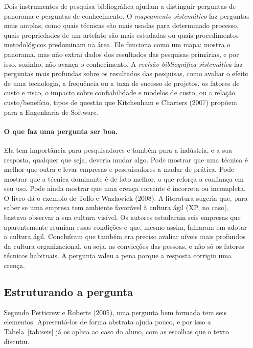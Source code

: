 \documentclass[10pt,a4paper]{extarticle}
\theoremstyle{definition}
\begin{document}
Dois instrumentos de pesquisa bibliográfica ajudam a distinguir perguntas de panorama e perguntas de conhecimento. O \emph{mapeamento sistemático} faz perguntas mais amplas, como quais técnicas são mais usadas para determinado processo, quais propriedades de um artefato são mais estudadas ou quais procedimentos metodológicos predominam na área. Ele funciona como um mapa: mostra o panorama, mas não extrai dados dos resultados das pesquisas primárias, e por isso, sozinho, não avança o conhecimento. A \emph{revisão bibliográfica sistemática} faz perguntas mais profundas sobre os resultados das pesquisas, como avaliar o efeito de uma tecnologia, a frequência ou a taxa de sucesso de projetos, os fatores de custo e risco, o impacto sobre confiabilidade e modelos de custo, ou a relação custo/benefício, tipos de questão que Kitchenham e Charters (2007) propõem para a Engenharia de Software.

\paragraph{O que faz uma pergunta ser boa.} Ela tem importância para pesquisadores e também para a indústria, e a sua resposta, qualquer que seja, deveria mudar algo. Pode mostrar que uma técnica é melhor que outra e levar empresas e pesquisadores a mudar de prática. Pode mostrar que a técnica dominante é de fato melhor, o que reforça a confiança em seu uso. Pode ainda mostrar que uma crença corrente é incorreta ou incompleta. O livro dá o exemplo de Tolfo e Wazlawick (2008). A literatura sugeria que, para saber se uma empresa tem ambiente favorável à cultura ágil (XP, no caso), bastava observar a sua cultura visível. Os autores estudaram seis empresas que aparentemente reuniam essas condições e que, mesmo assim, falharam em adotar a cultura ágil. Concluíram que também era preciso avaliar níveis mais profundos da cultura organizacional, ou seja, as convicções das pessoas, e não só os fatores técnicos habituais. A pergunta valeu a pena porque a resposta corrigiu uma crença.

\subsection{Estruturando a pergunta}

Segundo Petticrew e Roberts (2005), uma pergunta bem formada tem seis elementos. Apresentá-los de forma abstrata ajuda pouco, e por isso a Tabela~\ref{tab:seis} já os aplica ao caso do aluno, com as escolhas que o texto discutiu.
\end{document}
